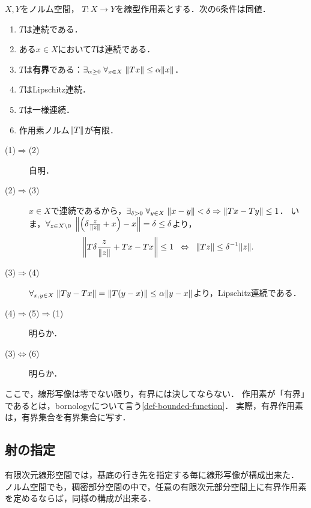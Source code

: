 \documentclass[uplatex,dvipdfmx]{jsreport}
\begin{document}
\begin{proposition}
    $X,Y$をノルム空間，
    $T:X\to Y$を線型作用素とする．次の6条件は同値．
    \begin{enumerate}
        \item $T$は連続である．
        \item ある$x\in X$において$T$は連続である．
        \item $T$は\textbf{有界}である：$\exists_{\alpha\ge 0}\;\forall_{x\in X}\;\|Tx\|\le\alpha\|x\|$．
        \item $T$はLipschitz連続．
        \item $T$は一様連続．
        \item 作用素ノルム$\|T\|$が有限．
    \end{enumerate}
\end{proposition}
\begin{Proof}\mbox{}
    \begin{description}
        \item[(1)$\Rightarrow$(2)] 自明．
        \item[(2)$\Rightarrow$(3)] $x\in X$で連続であるから，$\exists_{\delta>0}\;\forall_{y\in X}\;\|x-y\|<\delta\Rightarrow\|Tx-Ty\|\le 1$．
        いま，$\forall_{z\in X\setminus 0}\;\left\|\left(\delta\frac{z}{\|z\|}+x\right)-x\right\|=\delta\le\delta$より，
        \[\left\|T\delta\frac{z}{\|z\|}+Tx-Tx\right\|\le 1\;\;\Leftrightarrow\;\;\|Tz\|\le\delta^{-1}\|z\|.\]
        \item[(3)$\Rightarrow$(4)]
        $\forall_{x,y\in X}\;\|Ty-Tx\|=\|T(y-x)\|\le\alpha\|y-x\|$より，Lipschitz連続である．
        \item[(4)$\Rightarrow$(5)$\Rightarrow$(1)] 明らか．
        \item[(3)$\Leftrightarrow$(6)] 明らか．
    \end{description}
\end{Proof}
\begin{remark}
    ここで，線形写像は零でない限り，有界には決してならない．
    作用素が「有界」であるとは，bornologyについて言う\ref{def-bounded-function}．
    実際，有界作用素は，有界集合を有界集合に写す．
\end{remark}

\subsection{射の指定}

\begin{tcolorbox}[colframe=ForestGreen, colback=ForestGreen!10!white,breakable,colbacktitle=ForestGreen!40!white,coltitle=black,fonttitle=\bfseries\sffamily,
title=]
    有限次元線形空間では，基底の行き先を指定する毎に線形写像が構成出来た．
    ノルム空間でも，稠密部分空間の中で，任意の有限次元部分空間上に有界作用素を定めるならば，同様の構成が出来る．
\end{tcolorbox}
\end{document}
